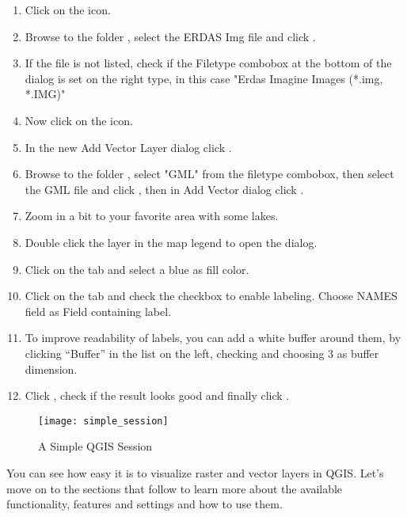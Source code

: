 
\begin{enumerate}
\item Click on the  icon.
\item Browse to the folder , select 
the ERDAS Img file  and click .
\item If the file is not listed, check if the Filetype combobox at the
bottom of the dialog is set on the right type, in this case "Erdas Imagine
Images (*.img, *.IMG)"
\item Now click on the  icon.
\item In the new Add Vector Layer dialog click .
\item Browse to the folder , select "GML"
from the filetype combobox, then select the GML file  
and click , then in Add Vector dialog click .
\item Zoom in a bit to your favorite area with some lakes.
\item Double click the  layer in the map legend to open the 
 dialog.
\item Click on the  tab and select a blue as fill color.
\item Click on the  tab and check the  
checkbox to enable labeling. Choose NAMES field as Field containing label.
\item To improve readability of labels, you can add a white buffer around them,
by clicking ``Buffer'' in the list on the left, checking  and choosing 3 as buffer dimension.
\item Click , check if the result looks good and finally
click .
\end{enumerate} 

\begin{figure}[ht]
   \begin{center}
   \caption{A Simple QGIS Session \nixcaption}\label{fig:simple_session}\smallskip
   \texttt{[image: simple\_session]}
\end{center}  
\end{figure}

You can see how easy it is to visualize raster and vector layers in 
QGIS. Let's move on to the sections that follow to learn more about the 
available functionality, features and settings and how to use them.
